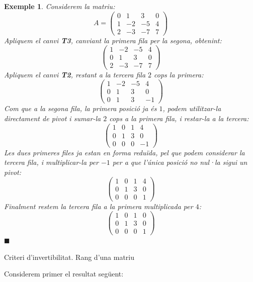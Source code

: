 \documentclass[
  11pt,
]{book}
\makeatletter
\numberwithin{dummy}{section}
\theoremstyle{maincolornumbox}
\theoremstyle{blacknumex}
\newtheorem{exampleT}{Exemple}[chapter]
\theoremstyle{blacknumbox}
\theoremstyle{maincolornum}
\newenvironment{example}{\begin{exampleT}}{\hfill{\tiny\ensuremath{\blacksquare}}\end{exampleT}}
\renewcommand{\section}{\@startsection{section}{1}{\z@}
{-4ex \@plus -1ex \@minus -.4ex}
{1ex \@plus.2ex }
{\normalfont\large\sffamily\bfseries}}
\makeatother
\begin{document}
\begin{example}
Considerem la matriu: \[A=\begin{pmatrix}
    0 & 1 & 3 & 0 \\  1 & -2 & -5 & 4\\ 2 & -3 & -7 & 7
    \end{pmatrix}\] Apliquem el canvi \textbf{T3}, canviant la primera fila per
la segona, obtenint: \[\begin{pmatrix}
    1 & -2 & -5 & 4\\0 & 1 & 3 & 0 \\   2 & -3 & -7 & 7
    \end{pmatrix}\] Apliquem el canvi \textbf{T2}, restant a la tercera fila \(2\)
cops la primera: \[\begin{pmatrix}
    1 & -2 & -5 & 4\\0 & 1 & 3 & 0 \\   0 & 1 & 3 & -1
    \end{pmatrix}\] Com que a la segona fila, la primera posició ja és \(1\),
podem utilitzar-la directament de pivot i sumar-la \(2\) cops a la primera
fila, i restar-la a la tercera: \[\begin{pmatrix}
    1 & 0 & 1 & 4\\0 & 1 & 3 & 0 \\   0 & 0 & 0 & -1
    \end{pmatrix}\] Les dues primeres files ja estan en forma reduïda, pel
que podem considerar la tercera fila, i multiplicar-la per \(-1\) per a
que l'única posició no nul·la sigui un pivot: \[\begin{pmatrix}
    1 & 0 & 1 & 4\\0 & 1 & 3 & 0 \\   0 & 0 & 0 & 1
    \end{pmatrix}\] Finalment restem la tercera fila a la primera
multiplicada per \(4\): \[\begin{pmatrix}
    1 & 0 & 1 & 0\\0 & 1 & 3 & 0 \\   0 & 0 & 0 & 1
    \end{pmatrix}\]
\end{example}

\section{Criteri d'invertibilitat. Rang d'una matriu}\label{criteri-dinvertibilitat.-rang-duna-matriu}

Considerem primer el resultat següent:
\end{document}
